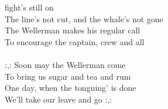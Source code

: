 fight's still on \\ The line's not cut, and the whale's not gone \\ The Wellerman makes his regular call \\ To encourage the captain, crew and all \\ \hspace{10mm} \\ :,: Soon may the Wellerman come \\ To bring us sugar and tea and rum \\ One day, when the tonguing' is done \\ We'll take our leave and go :,:
